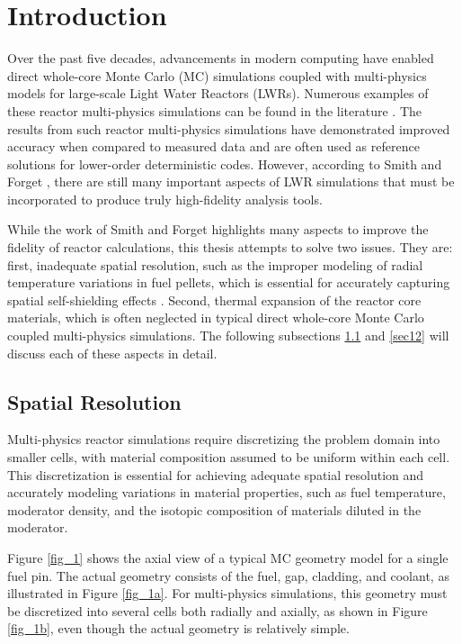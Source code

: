 \section{Introduction} \label{s1}

Over the past five decades, advancements in modern computing have enabled direct whole-core Monte Carlo (MC) simulations coupled with multi-physics models for large-scale Light Water Reactors (LWRs). Numerous examples of these reactor multi-physics simulations can be found in the literature \cite{tung_2020,kelly_2017,ma_2019}. The results from such reactor multi-physics simulations have demonstrated improved accuracy when compared to measured data and are often used as reference solutions for lower-order deterministic codes. However, according to Smith and Forget \cite{smith_2013}, there are still many important aspects of LWR simulations that must be incorporated to produce truly high-fidelity analysis tools.

While the work of Smith and Forget highlights many aspects to improve the fidelity of reactor calculations, this thesis attempts to solve two issues. They are: first, inadequate spatial resolution, such as the improper modeling of radial temperature variations in fuel pellets, which is essential for accurately capturing spatial self-shielding effects \cite{nchoi_2020}. Second, thermal expansion of the reactor core materials, which is often neglected in typical direct whole-core Monte Carlo coupled multi-physics simulations. The following subsections \ref{sec11} and \ref{sec12} will discuss each of these aspects in detail.

\subsection{Spatial Resolution} \label{sec11}

Multi-physics reactor simulations require discretizing the problem domain into smaller cells, with material composition assumed to be uniform within each cell. This discretization is essential for achieving adequate spatial resolution and accurately modeling variations in material properties, such as fuel temperature, moderator density, and the isotopic composition of materials diluted in the moderator.

Figure \ref{fig_1} shows the axial view of a typical MC geometry model for a single fuel pin. The actual geometry consists of the fuel, gap, cladding, and coolant, as illustrated in Figure \ref{fig_1a}. For multi-physics simulations, this geometry must be discretized into several cells both radially and axially, as shown in Figure \ref{fig_1b}, even though the actual geometry is relatively simple.

